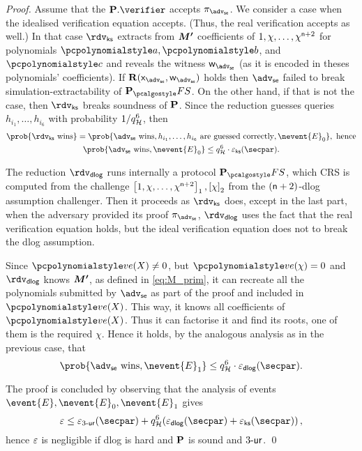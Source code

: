 \documentclass[runningheads,11pt]{llncs}
\let\spvec\vec
\let\vec\accentvec
\let\vec\spvec
\def\vec#1{\mathchoice{\mbox{\boldmath$\displaystyle#1$}}
	{\mbox{\boldmath$\textstyle#1$}}
	{\mbox{\boldmath$\scriptstyle#1$}}
	{\mbox{\boldmath$\scriptscriptstyle#1$}}}
\theoremstyle{definition}
\begin{document}
\begin{proof}
Assume that the $\plonkprot.\verifier$ accepts $\zkproof_\advse$. We consider a case when the idealised verification equation accepts. (Thus, the real verification accepts as well.) 
In that case $\rdvks$ extracts from $\vec{M'}$ coefficients of $1, \chi, \ldots, \chi^{\mathsf{n} + 2}$ for polynomials $\p{a}, \p{b}$, and $\p{c}$ and reveals the witness $\wit_\advse$ (as it is encoded in theses polynomials' coefficients).
If $\REL(\inp_\advse, \wit_\advse)$ holds then $\advse$ failed to break simulation-extractability of $\plonkprotfs$. On the other hand, if that is not the case, then $\rdvks$ breaks soundness of $\mathbf{P}$.
%
Since the reduction guesses queries $h_{i_1}, \ldots, h_{i_6}$ with probability $1/q_{\mathcal{H}}^6$, then 
\begin{gather*}
	\prob{\rdvks \text{ wins}} = \prob{\advse \text{ wins}, h_{i_1}, \ldots, h_{i_6} \text{ are guessed correctly}, \nevent{E}_0}, \text{ hence}\\
	\prob{\advse \text{ wins}, \nevent{E}_0} \leq q_\ro^6 \cdot \eps_{\ks}(\secpar).
\end{gather*}

The reduction $\rdvdlog$ runs internally a protocol $\plonkprotfs$, which CRS is computed from the challenge $\left[1, \chi, \ldots, \chi^{\mathsf{n} + 2}\right]_{1}, \left[\chi\right]_{2}$ from the $(\mathsf{n} + 2)$-dlog assumption challenger. 
Then it proceeds as $\rdvks$ does, except in the last part, when the adversary provided its proof $\zkproof_\advse$, $\rdvdlog$ uses the fact that the real verification equation holds, but the ideal verification equation does not to break the dlog assumption. 


Since $\vereq(X) \neq 0$, but $\vereq(\chi) = 0$ and $\rdvdlog$ knows
$\vec{M'}$, as defined in \cref{eq:M_prim}, it can recreate all the polynomials
submitted by $\advse$ as part of the proof and included in $\vereq(X)$. This
way, it knows all coefficients of $\vereq(X)$. Thus it can factorise it and find
its roots, one of them is the required $\chi$. Hence it holds, by the analogous analysis as in the previous case, that
\[
	\prob{\advse \text{ wins}, \nevent{E}_1} \leq q_\ro^6 \cdot \eps_{\dlog}(\secpar).
\]

The proof is concluded by observing that the analysis of events $\event{E}, \nevent{E}_0, \nevent{E}_1$ gives
\[
	\eps \leq \eps_{\ur{3}}(\secpar) + q_\ro^6 (\eps_{\dlog}(\secpar) + \eps_{\ks}(\secpar))\,,
\]
hence $\varepsilon$ is negligible if dlog is hard and $\mathbf{P}$ is sound and ${3\text{-}\mathsf{ur}}$.
\qed
\end{proof}
\end{document}
